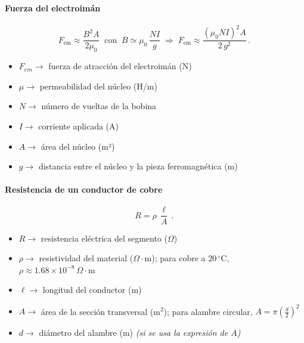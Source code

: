 \cite{openstax_inertia_2016}

\paragraph{Fuerza del electroimán}
\begin{equation}
  F_{\mathrm{em}} \approx \frac{B^{2}A}{2\mu_{0}} \;\;\text{con}\;\; B \simeq \mu_{0}\,\frac{N I}{g}
  \;\Rightarrow\;
  F_{\mathrm{em}} \approx \frac{(\mu_{0} N I)^{2} A}{2\,g^{2}} \,.\,
\end{equation}

\begin{itemize}
  \item $F_{{em}} \rightarrow$ fuerza de atracción del electroimán (N)
  \item $\mu \rightarrow$ permeabilidad del núcleo (H/m)
  \item $N \rightarrow$ número de vueltas de la bobina
  \item $I \rightarrow$ corriente aplicada (A)
  \item $A \rightarrow$ área del núcleo (m²)
  \item $g \rightarrow$ distancia entre el núcleo y la pieza ferromagnética (m)
\end{itemize}

\cite{wiki_magnetic_pressure_2025}

\paragraph{Resistencia de un conductor de cobre}
\begin{equation}
  R = \rho\,\frac{\ell}{A} \,.\,
\end{equation}

\begin{itemize}
  \item $R \rightarrow$ resistencia eléctrica del segmento ($\Omega$)
  \item $\rho \rightarrow$ resistividad del material ($\Omega\!\cdot\!\mathrm{m}$); para cobre a $20\,^{\circ}\mathrm{C}$, $\rho \approx 1.68\times 10^{-8}\ \Omega\!\cdot\!\mathrm{m}$
  \item $\ell \rightarrow$ longitud del conductor (m)
  \item $A \rightarrow$ área de la sección transversal (m$^{2}$); para alambre circular, $A=\pi\!\left(\frac{d}{2}\right)^{2}$
  \item $d \rightarrow$ diámetro del alambre (m) \emph{(si se usa la expresión de $A$)}
\end{itemize}

